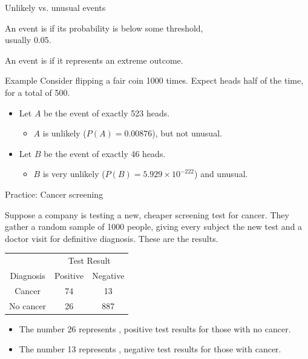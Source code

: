 \documentclass[xcolor=table, handout]{beamer}
\begin{document}
\begin{frame}{Unlikely vs. unusual events}
\begin{block}{}
\large An event is  if its probability is below some threshold,\\ usually 0.05.
\end{block}

\begin{block}{}
\large An event is  if it represents an extreme outcome.
\end{block}

\pause

\begin{exampleblock}{Example}
Consider flipping a fair coin 1000 times. Expect heads half of the time, for a total of 500.

\begin{itemize}
\pause
\item Let $A$ be the event of exactly 523 heads.
\begin{itemize}
\pause
\item $A$ is unlikely ($P(A) = 0.00876$), but not unusual.
\end{itemize}

\pause
\item  Let $B$ be the event of exactly 46 heads.
\begin{itemize}
\pause
\item $B$ is very unlikely ($P(B) = 5.929 \times 10^{-222}$) and unusual.
\end{itemize}
\end{itemize}
\end{exampleblock}
\end{frame}

\begin{frame}{Practice: Cancer screening}
\begin{block}{}
Suppose a company is testing a new, cheaper screening test for cancer. They gather a random sample of 1000 people, giving every subject the new test and a doctor visit for definitive diagnosis. These are the results.\\
\medskip
{\centering
\begin{tabular}{c | c  c}
\multicolumn{1}{c}{} & \multicolumn{2}{c}{Test Result}\\
Diagnosis & Positive & Negative\\
\hline
Cancer & 74 & 13\\
No cancer & 26 & 887 \\
\end{tabular}\par
}
\smallskip
\begin{itemize}
\pause
\item The number 26 represents , positive test results for those with no cancer.
\pause
\item The number 13 represents , negative test results for those with cancer.
\end{itemize}
\end{block}
\end{frame}
\end{document}
